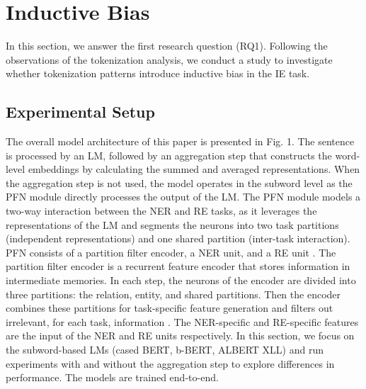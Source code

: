\documentclass[runningheads]{llncs}
\begin{document}
\section{Inductive Bias}
\vspace{-3mm}
In this section, we answer the first research question (RQ1). Following the observations of the tokenization analysis, we conduct a study to investigate whether tokenization patterns introduce inductive bias in the IE task. 
\vspace{-3.5mm}
\subsection{Experimental Setup}
\vspace{-2.5mm}
The overall model architecture of this paper is presented in Fig. 1. The sentence is processed by an LM, followed by an aggregation step that constructs the word-level embeddings by calculating the summed and averaged representations. When the aggregation step is not used, the model operates in the subword level as the PFN module directly processes the output of the LM. The PFN module models a two-way interaction between the NER and RE tasks, as it leverages the representations of the LM and segments the neurons into two task partitions (independent representations) and one shared partition (inter-task interaction). PFN consists of a partition filter encoder, a NER unit, and a RE unit \cite{yan-etal-2021-partition}. The partition filter encoder is a recurrent feature encoder that stores information in intermediate memories. In each step, the neurons of the encoder are divided into three partitions: the relation, entity, and shared partitions. Then the encoder combines these partitions for task-specific feature generation and filters out irrelevant, for each task, information \cite{yan-etal-2021-partition}. The NER-specific and RE-specific features are the input of the NER and RE units respectively. In this section, we focus on the subword-based LMs (cased BERT, b-BERT, ALBERT XLL) and run experiments with and without the aggregation step to explore differences in performance. The models are trained end-to-end.
\end{document}
